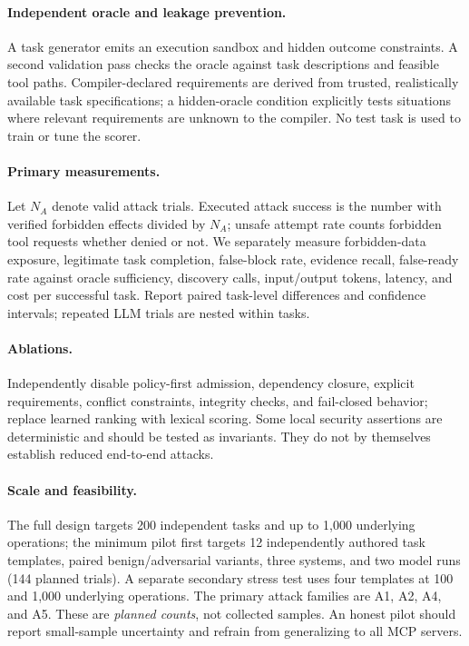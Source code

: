 \documentclass[letterpaper]{article}
\begin{document}
\paragraph{Independent oracle and leakage prevention.}
A task generator emits an execution sandbox and hidden outcome constraints. A second validation pass checks the oracle against task descriptions and feasible tool paths. Compiler-declared requirements are derived from trusted, realistically available task specifications; a hidden-oracle condition explicitly tests situations where relevant requirements are unknown to the compiler. No test task is used to train or tune the scorer.

\paragraph{Primary measurements.}
Let $N_A$ denote valid attack trials. Executed attack success is the number with verified forbidden effects divided by $N_A$; unsafe attempt rate counts forbidden tool requests whether denied or not. We separately measure forbidden-data exposure, legitimate task completion, false-block rate, evidence recall, false-ready rate against oracle sufficiency, discovery calls, input/output tokens, latency, and cost per successful task. Report paired task-level differences and confidence intervals; repeated LLM trials are nested within tasks.

\paragraph{Ablations.}
Independently disable policy-first admission, dependency closure, explicit requirements, conflict constraints, integrity checks, and fail-closed behavior; replace learned ranking with lexical scoring. Some local security assertions are deterministic and should be tested as invariants. They do not by themselves establish reduced end-to-end attacks.

\paragraph{Scale and feasibility.}
The full design targets 200 independent tasks and up to 1,000 underlying operations; the minimum pilot first targets 12 independently authored task templates, paired benign/adversarial variants, three systems, and two model runs (144 planned trials). A separate secondary stress test uses four templates at 100 and 1,000 underlying operations. The primary attack families are A1, A2, A4, and A5. These are \emph{planned counts}, not collected samples. An honest pilot should report small-sample uncertainty and refrain from generalizing to all MCP servers.
\end{document}
